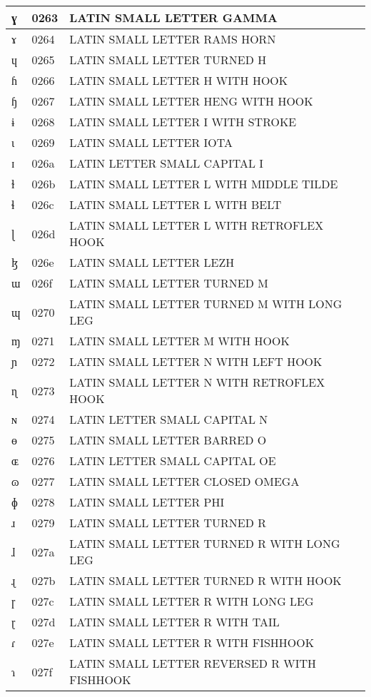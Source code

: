 \documentclass[12pt,letterpaper,openany]{book}
\begin{document}
\begin{center}
\begin{supertabular}{|m{0.25in}|m{0.5in}|m{4in}|}
ɣ & 0263 & LATIN SMALL LETTER GAMMA\\\hline
ɤ & 0264 & LATIN SMALL LETTER RAMS HORN\\\hline
ɥ & 0265 & LATIN SMALL LETTER TURNED H\\\hline
ɦ & 0266 & LATIN SMALL LETTER H WITH HOOK\\\hline
ɧ & 0267 & LATIN SMALL LETTER HENG WITH HOOK\\\hline
ɨ & 0268 & LATIN SMALL LETTER I WITH STROKE\\\hline
ɩ & 0269 & LATIN SMALL LETTER IOTA\\\hline
ɪ & 026a & LATIN LETTER SMALL CAPITAL I\\\hline
ɫ & 026b & LATIN SMALL LETTER L WITH MIDDLE TILDE\\\hline
ɬ & 026c & LATIN SMALL LETTER L WITH BELT\\\hline
ɭ & 026d & LATIN SMALL LETTER L WITH RETROFLEX HOOK\\\hline
ɮ & 026e & LATIN SMALL LETTER LEZH\\\hline
ɯ & 026f & LATIN SMALL LETTER TURNED M\\\hline
ɰ & 0270 & LATIN SMALL LETTER TURNED M WITH LONG LEG\\\hline
ɱ & 0271 & LATIN SMALL LETTER M WITH HOOK\\\hline
ɲ & 0272 & LATIN SMALL LETTER N WITH LEFT HOOK\\\hline
ɳ & 0273 & LATIN SMALL LETTER N WITH RETROFLEX HOOK\\\hline
ɴ & 0274 & LATIN LETTER SMALL CAPITAL N\\\hline
ɵ & 0275 & LATIN SMALL LETTER BARRED O\\\hline
ɶ & 0276 & LATIN LETTER SMALL CAPITAL OE\\\hline
ɷ & 0277 & LATIN SMALL LETTER CLOSED OMEGA\\\hline
ɸ & 0278 & LATIN SMALL LETTER PHI\\\hline
ɹ & 0279 & LATIN SMALL LETTER TURNED R\\\hline
ɺ & 027a & LATIN SMALL LETTER TURNED R WITH LONG LEG\\\hline
ɻ & 027b & LATIN SMALL LETTER TURNED R WITH HOOK\\\hline
ɼ & 027c & LATIN SMALL LETTER R WITH LONG LEG\\\hline
ɽ & 027d & LATIN SMALL LETTER R WITH TAIL\\\hline
ɾ & 027e & LATIN SMALL LETTER R WITH FISHHOOK\\\hline
ɿ & 027f & LATIN SMALL LETTER REVERSED R WITH FISHHOOK\\\hline

\end{supertabular}
\end{center}
\end{document}
